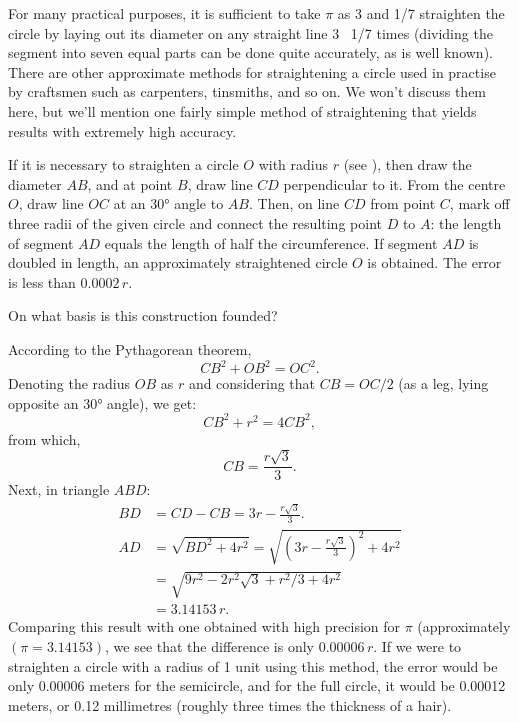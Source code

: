 For many practical purposes, it is sufficient to take $\pi$ as 3 and  1/7 straighten the circle by laying out its diameter on any straight line 3 \, 1/7 times (dividing the segment into seven equal parts can be done quite accurately, as is well known). There are other approximate methods for straightening a circle used in practise by craftsmen such as carpenters, tinsmiths, and so on. We won't discuss them here, but we'll mention one fairly simple method of straightening that yields results with extremely high accuracy.



If it is necessary to straighten a circle $O$ with radius $r$ (see ), then draw the diameter $AB$, and at point $B$, draw line $CD$ perpendicular to it. From the centre $O$, draw line $OC$ at an \ang{30} angle to $AB$. Then, on line $CD$ from point $C$, mark off three radii of the given circle and connect the resulting point $D$ to $A$: the length of segment $AD$ equals the length of half the circumference. If segment $AD$ is doubled in length, an approximately straightened circle $O$ is obtained. The error is less than $0.0002\, r$.

On what basis is this construction founded?

\ans According to the Pythagorean theorem, 
\begin{equation*}%
CB^{2} + OB^{2} = OC^{2}.
\end{equation*}
Denoting the radius $OB$ as $r$ and considering that $CB = OC/2$ (as a leg, lying opposite an \ang{30} angle), we get: 
\begin{equation*}%
CB^{2} + r^{2} = 4CB^{2}, 
\end{equation*}
from which,
\begin{equation*}%
CB = \frac{r \sqrt{3}}{3}.
\end{equation*}
Next, in triangle $ABD$:
\begin{align*}%
BD & =  CD - CB = 3r - \frac{r\sqrt{3}}{3}.\\
AD & = \sqrt{BD^{2} + 4r^{2}} = \sqrt{\left( 3r - \frac{r \sqrt{3}}{3} \right)^{2} + 4r^{2}} \\
& = \sqrt{9r^{2} - 2r^{2}\sqrt{3} + r^{2}/3 + 4r^{2}} \\
& = 3.14153\, r.
\end{align*}
Comparing this result with one obtained with high precision for $\pi$ (approximately $( \pi = 3.14153)$, we see that the difference is only $0.00006\, r$. If we were to straighten a circle with a radius of 1 unit using this method, the error would be only 0.00006 meters for the semicircle, and for the full circle, it would be 0.00012 meters, or 0.12 millimetres (roughly three times the thickness of a hair).


